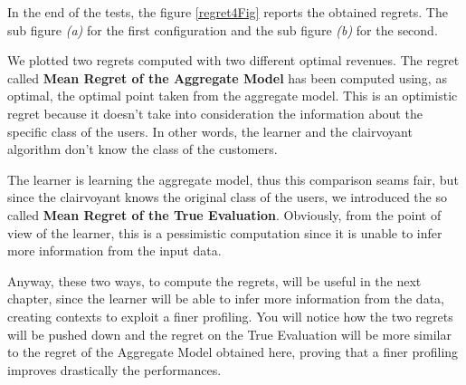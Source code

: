 In the end of the tests, the figure \ref{regret4Fig} reports the obtained regrets. The sub figure \textit{(a)} for the first configuration and the sub figure \textit{(b)} for the second.

We plotted two regrets computed with two different optimal revenues.
The regret called \textbf{Mean Regret of the Aggregate Model} has been computed using, as optimal, the optimal point taken from the aggregate model. This is an optimistic regret because it doesn't take into consideration the information about the specific class of the users. In other words, the learner and the clairvoyant algorithm don't know the class of the customers.

The learner is learning the aggregate model, thus this comparison seams fair, but since the clairvoyant knows the original class of the users, we introduced the so called \textbf{Mean Regret of the True Evaluation}. Obviously, from the point of view of the learner, this is a pessimistic computation since it is unable to infer more information from the input data.

Anyway, these two ways, to compute the regrets, will be useful in the next chapter, since the learner will be able to infer more information from the data, creating contexts to exploit a finer profiling.
You will notice how the two regrets will be pushed down and the regret on the True Evaluation will be more similar to the regret of the Aggregate Model obtained here, proving that a finer profiling improves drastically the performances.


